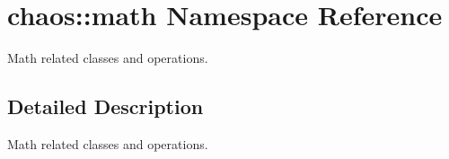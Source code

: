 \hypertarget{namespacechaos_1_1math}{}\section{chaos\+:\+:math Namespace Reference}
\label{namespacechaos_1_1math}


Math related classes and operations.  




\subsection{Detailed Description}
Math related classes and operations. 